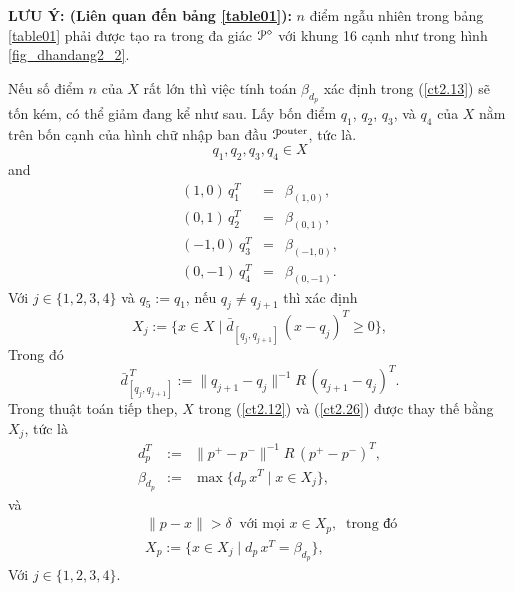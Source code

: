 \documentclass[12pt,a4paper,openany,oneside]{report}
\begin{document}
	\bigskip\noindent
	{\bf LƯU Ý: (Liên quan đến bảng \ref{table01}):} 
	 $n$ điểm ngẫu nhiên trong bảng \ref{table01} phải được tạo ra trong đa giác ${\cal P}^\diamond$ với khung 16 cạnh như trong hình \ref{fig_dhandang2_2}.
	
	\bigskip


Nếu số điểm $n$ của $X$ rất lớn thì việc tính toán $\beta_{d_{p}}$ xác định trong (\ref{ct2.13}) sẽ tốn kém, có thể giảm đang kể như sau. Lấy bốn điểm  $q_1$, $q_2$, $q_3$, và $q_4$ của $X$ nằm trên bốn cạnh của hình chữ nhập ban đầu ${\cal P}^{\rm outer}$, tức là.
\begin{equation}\label{ct2.30}
	q_1, q_2, q_3, q_4 \in X
\end{equation}
and
\begin{equation}\label{ct2.31}
	\begin{array}{lcl}
		(1, 0)\, q_1^T &=& \beta_{(1, 0)}, \\
		(0, 1)\, q_2^T &=& \beta_{(0, 1)}, \\
		(-1, 0)\, q_3^T &=& \beta_{(-1, 0)}, \\
		(0, -1)\, q_4^T &=& \beta_{(0, -1)}.
	\end{array}
\end{equation}
Với $j \in \{1, 2, 3, 4\}$ và $q_5 := q_1$, nếu $q_j \not= q_{j+1}$ thì xác định
\begin{equation}\label{ct2.32}
	X_j := \{x \in X \mid \bar d_{[q_j, q_{j+1}]}\, (x - q_j)^T \geq 0\}, 
\end{equation}
Trong đó
\begin{equation}\label{ct2.33}
	\bar d_{[q_j, q_{j+1}]}^{\, T} := \|q_{j+1} - q_j\|^{-1} R\, (q_{j+1} - q_j)^T.
\end{equation}
Trong thuật toán tiếp thep, $X$ trong (\ref{ct2.12}) và (\ref{ct2.26}) được thay thế bằng $X_j$, tức là
\begin{equation}\label{ct2.34}
	\begin{array}{lcl}
		d_{p}^T &:=& \|p^+ - p^-\|^{-1} R \, (p^+ - p^-)^T, \\
		\beta_{d_{p}} &:=& \max\{d_{p}\, x^T \mid x \in X_j\}, 
	\end{array}
\end{equation}
và
\begin{equation}\label{ct2.35}
	\begin{array}{lcl}
		&& \|p - x\| > \delta \ \mbox{ với mọi } x \in X_p, \ \mbox{ trong đó} \\
		&& X_p := \{x \in X_j \mid d_{p}\, x^T = \beta_{d_{p}}\},
	\end{array}
\end{equation}
Với $j \in \{1, 2, 3, 4\}$.
\end{document}
